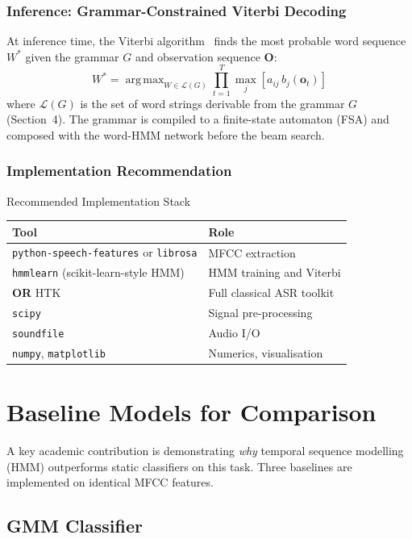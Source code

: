 \documentclass[12pt,a4paper]{article}
\DeclareMathOperator*{\argmax}{arg\,max}
\newcommand{\obs}{\mathbf{O}}
\begin{document}
\subsubsection{Inference: Grammar-Constrained Viterbi Decoding}

At inference time, the Viterbi algorithm~\cite{viterbi1967error} finds the
most probable word sequence $W^*$ given the grammar $G$ and observation
sequence $\obs$:
\[
  W^* = \argmax_{W \in \mathcal{L}(G)}
        \prod_{t=1}^{T} \max_j \left[ a_{ij}\,b_j(\mathbf{o}_t) \right]
\]
where $\mathcal{L}(G)$ is the set of word strings derivable from the grammar $G$
(Section~4).
The grammar is compiled to a finite-state automaton (FSA) and composed with
the word-HMM network before the beam search.

\subsubsection{Implementation Recommendation}

\begin{keybox}{Recommended Implementation Stack}
\begin{tabular}{ll}
\textbf{Tool} & \textbf{Role} \\
\hline
\texttt{python-speech-features} or \texttt{librosa} & MFCC extraction \\
\texttt{hmmlearn} (scikit-learn-style HMM) & HMM training and Viterbi \\
\textbf{OR} HTK~\cite{young1994htk} & Full classical ASR toolkit \\
\texttt{scipy} & Signal pre-processing \\
\texttt{soundfile} & Audio I/O \\
\texttt{numpy}, \texttt{matplotlib} & Numerics, visualisation \\
\end{tabular}
\end{keybox}

\section{Baseline Models for Comparison}

A key academic contribution is demonstrating \emph{why} temporal sequence
modelling (HMM) outperforms static classifiers on this task.
Three baselines are implemented on identical MFCC features.

\subsection{GMM Classifier}
\label{sec:gmm}
\end{document}

